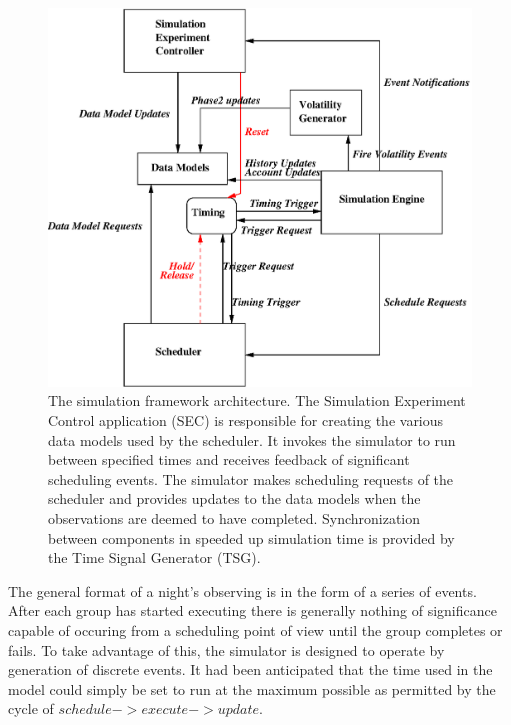 \begin{figure}[htbp]  
  \begin{center}
    \includegraphics[scale=0.8, angle=0]{figures/sim_framework_arch.eps}
  \end{center}
  \caption[Architecture of the simulation framework.]
   {The simulation framework architecture. The Simulation Experiment Control application (SEC) is responsible for creating the various data models used by the scheduler. It invokes the simulator to run between specified times and receives feedback of significant scheduling events. The simulator makes scheduling requests of the scheduler and provides updates to the data models when the observations are deemed to have completed. Synchronization between components in speeded up simulation time is provided by the Time Signal Generator (TSG).}
  \label{fig:sim_frame_arch}
\end{figure}

The general format of a night's observing is in the form of a series of events. After each group has started executing there is generally nothing of significance capable of occuring from a scheduling point of view until the group completes or fails. To take advantage of this, the simulator is designed to operate by generation of discrete events. It had been anticipated that the time used in the model could simply be set to run at the maximum possible as permitted by the cycle of $schedule -> execute -> update$.

